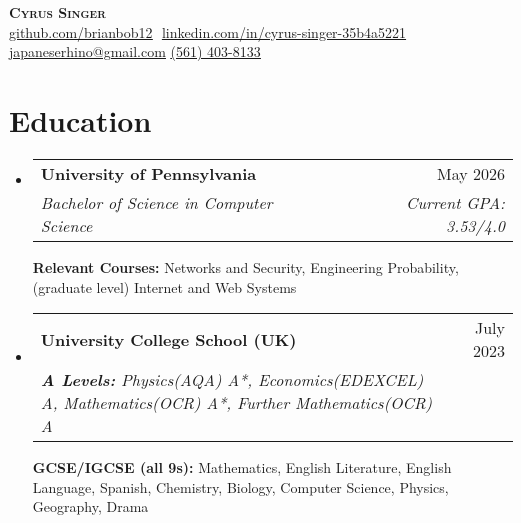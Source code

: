 \documentclass[letterpaper,11pt]{article}
\makeatletter
\newcommand{\resumeSubheading}[4]{
  \vspace{-2pt}\item
    \begin{tabular*}{0.97\textwidth}[t]{l@{\extracolsep{\fill}}r}
      \textbf{#1} & #2 \\
      \textit{\small#3} & \textit{\small #4} \\
    \end{tabular*}\vspace{-7pt}
}
\newcommand{\resumeSubHeadingListStart}{\begin{itemize}[leftmargin=0.15in, label={}]}
\newcommand{\resumeSubHeadingListEnd}{\end{itemize}}
\makeatother
\begin{document}
\hfill

\begin{center}
    \textbf{\Huge \scshape Cyrus Singer} \\ \vspace{8pt}
    \small 
    \href{https://github.com/brianbob12}{\underline{github.com/brianbob12}} $  $
    \href{https://www.linkedin.com/in/cyrus-singer-35b4a5221}{\underline{linkedin.com/in/cyrus-singer-35b4a5221}} $  $
    \href{mailto:japaneserhino@gmail.com}
    {\underline{japaneserhino@gmail.com}}
    \href{tel:561-403-8133}{\underline{(561) 403-8133}}
\end{center}

\section{Education}
  \resumeSubHeadingListStart
  
    \resumeSubheading
      {University of Pennsylvania}{May 2026}
      {Bachelor of Science in Computer Science}{Current GPA: 3.53/4.0}
      
      \vspace{5pt}

      \textbf{Relevant Courses:} \small{Networks and Security, Engineering Probability, (graduate level) Internet and Web Systems}\\

    \resumeSubheading
      {University College School \footnotesize{(UK)}}{July 2023} 
      {\textbf{A Levels:} \footnotesize{Physics(AQA) A*, Economics(EDEXCEL) A, Mathematics(OCR) A*, Further Mathematics(OCR) A}}{}
      \newline
      \newline
      {\textbf{GCSE/IGCSE (all 9s):} \footnotesize{Mathematics, English Literature, English Language, Spanish, Chemistry, Biology, Computer Science, Physics, Geography, Drama }}{}



  \resumeSubHeadingListEnd

\end{document}
